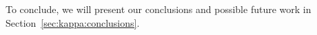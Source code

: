 To conclude, we will present our conclusions and possible future work in Section~\ref{sec:kappa:conclusions}.




